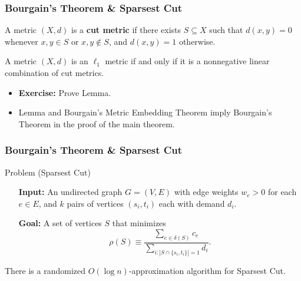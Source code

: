 \documentclass{beamer}
\begin{document}
    \begin{frame}
        \frametitle{Bourgain's Theorem \& {\sc Sparsest Cut}}
    
        \begin{definition}
            A metric $(X, d)$ is a {\bf cut metric} if there exists $S \subseteq X$ such that $d(x, y) = 0$ whenever $x, y \in S$ or $x, y \not \in S$, and $d(x, y) = 1$ otherwise.
        \end{definition}

        \pause

        \begin{lemma}
            A metric $(X, d)$ is an $\ell_1$ metric if and only if it is a nonnegative linear combination of cut metrics.
        \end{lemma}

        \pause

        \begin{itemize}
            \item {\bf Exercise:} Prove Lemma. \pause
            \item Lemma and Bourgain's Metric Embedding Theorem imply Bourgain's Theorem in the proof of the main theorem.
        \end{itemize}
    \end{frame}

    \begin{frame}
        \frametitle{Bourgain's Theorem \& {\sc Sparsest Cut}}

        \begin{block}{Problem ({\sc Sparsest Cut})}
            \setlength{\leftmargini}{3.25em}
            \begin{itemize}
                \item[\bf Input:] An undirected graph $G = (V, E)$ with edge weights $w_e > 0$ for each $e \in E$, and $k$ pairs of vertices $(s_i, t_i)$ each with demand $d_i$.
                \item[\bf Goal:] A set of vertices $S$ that minimizes
                $$ \rho(S) \equiv \frac{\sum_{e \in \delta(S)} c_e}{\sum_{i : |S \cap \{ s_i, t_i \}| = 1} d_i}. $$
            \end{itemize}
        \end{block}

        \pause

        \begin{corollary}
            There is a randomized $O(\log n)$-approximation algorithm for {\sc Sparsest Cut}.
        \end{corollary}
    \end{frame}
\end{document}
